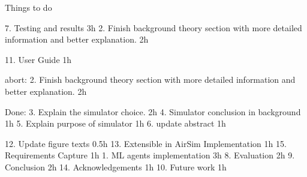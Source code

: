 

Things to do

7. Testing and results 3h
2. Finish background theory section with more detailed information and better explanation. 2h


11. User Guide 1h



abort:
2. Finish background theory section with more detailed information and better explanation. 2h





Done:
3. Explain the simulator choice. 2h
4. Simulator conclusion in background 1h
5. Explain purpose of simulator 1h
6. update abstract 1h

12. Update figure texts 0.5h
13. Extensible in AirSim Implementation 1h
15. Requirements Capture 1h
1. ML agents implementation 3h
8. Evaluation 2h
9. Conclusion 2h 
14. Acknowledgements 1h
10. Future work 1h
